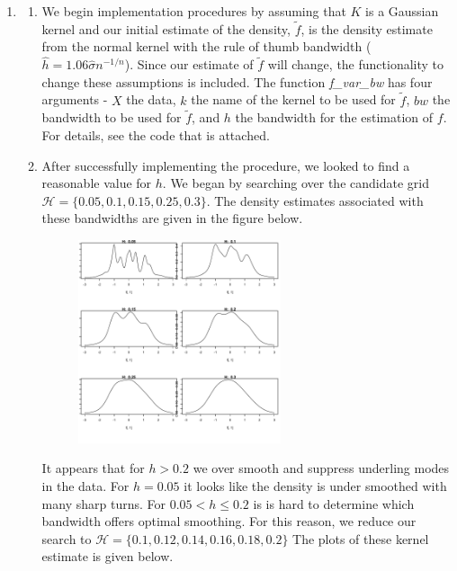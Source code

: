 \documentclass[12pt]{article}  %
\begin{document}
\begin{enumerate}

\item \begin{enumerate}

\item We begin implementation procedures by assuming that $K$ is a Gaussian kernel and our initial estimate of the density, $\widetilde{f}$, is the density estimate from the normal kernel with the rule of thumb bandwidth ($\hat{h} = 1.06\hat{\sigma}n^{-1/n}$). Since our estimate of $\widetilde{f}$ will change, the functionality to change these assumptions is included. The function \textit{f\_var\_bw} has four arguments - $X$ the data, $k$ the name of the kernel to be used for $\widetilde{f}$, $bw$ the bandwidth to be used for $\widetilde{f}$, and $h$ the bandwidth for the estimation of $f$. For details, see the code that is attached. 

\item After successfully implementing the procedure, we looked to find a reasonable value for $h$. We began by searching over the candidate grid $\mathcal{H} = \{0.05, 0.1, 0.15, 0.25, 0.3\}$. The density estimates associated with these bandwidths are given in the figure below. 

\begin{figure}[h]
\centering
\includegraphics[width = 0.6\textwidth]{p1.pdf}
\end{figure}

It appears that for $h>0.2$ we over smooth and suppress underling modes in the data. For $h = 0.05$ it looks like the density is under smoothed with many sharp turns. For $0.05<h\leq 0.2$ is is hard to determine which bandwidth offers optimal smoothing. For this reason, we reduce our search to $\mathcal{H} =\{0.1,0.12, 0.14, 0.16, 0.18, 0.2\}$ The plots of these kernel estimate is given below.


\end{enumerate}
\end{enumerate}
\end{document}
